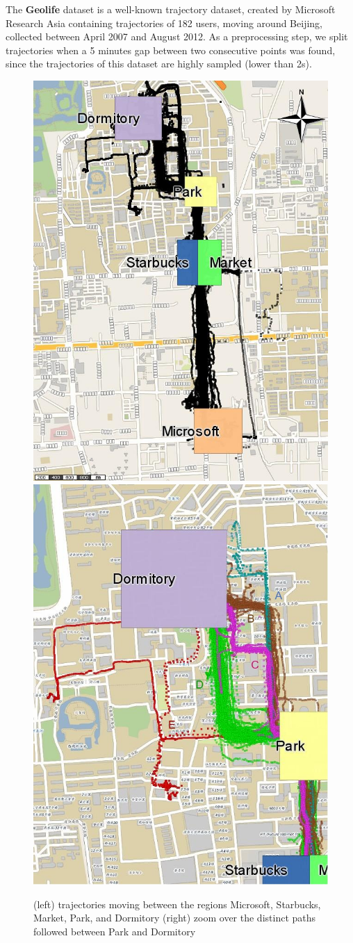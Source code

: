 \documentclass[12pt]{article}
\begin{document}
The \textbf{Geolife} dataset is a well-known trajectory dataset, created by Microsoft Research Asia \citep{zheng2009mining} containing trajectories of 182 users, moving around Beijing, collected between April 2007 and August 2012. As a preprocessing step, we split trajectories when a 5 minutes gap between two consecutive points was found, since the trajectories of this dataset are highly sampled (lower than 2s).

\begin{figure}[ht!]
\centering
\centerline{
\includegraphics[width=.5\textwidth]{Images/Geolife-Trajectories-painted}
\includegraphics[width=.5\textwidth]{Images/Geolife-Paths-painted}
}
\caption{(left) trajectories moving between the regions Microsoft, Starbucks, Market, Park, and Dormitory (right) zoom over the distinct paths followed between Park and Dormitory}
\label{fig:geolife_map_rois}
\end{figure}
\end{document}

